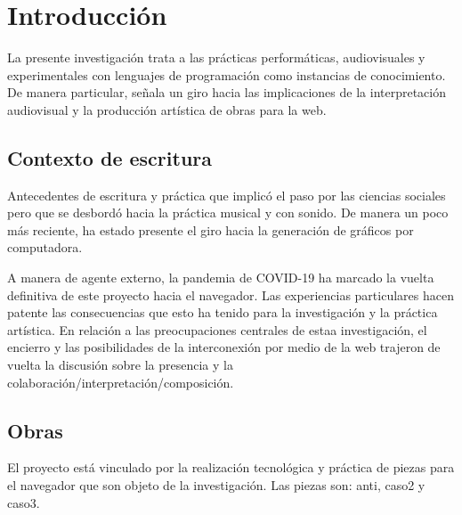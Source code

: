 


\chapter{Introducción}




La presente investigación trata a las prácticas performáticas, audiovisuales y experimentales con lenguajes de programación como instancias de conocimiento. De manera particular, señala un giro hacia las implicaciones de la interpretación audiovisual y la producción artística de obras para la web.


\section{Contexto de escritura} %

Antecedentes de escritura y práctica que implicó el paso por las ciencias sociales pero que se desbordó hacia la práctica musical y con sonido. De manera un poco más reciente, ha estado presente el giro hacia la generación de gráficos por computadora. 

A manera de agente externo, la pandemia de COVID-19 ha marcado la vuelta definitiva de este proyecto hacia el navegador. Las experiencias particulares hacen patente las consecuencias que esto ha tenido para la investigación y la práctica artística. En relación a las preocupaciones centrales de estaa investigación, el encierro y las posibilidades de la interconexión por medio de la web trajeron de vuelta la discusión sobre la presencia y la colaboración/interpretación/composición. 

\section{Obras}

El proyecto está vinculado por la realización tecnológica y práctica de piezas para el navegador que son objeto de la investigación. Las piezas son: anti, caso2 y caso3.

